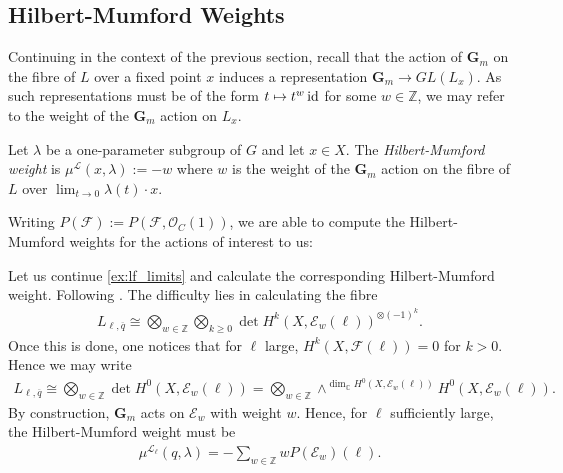 \documentclass[12pt]{ociamthesis}  %
\begin{document}
\subsection{Hilbert-Mumford Weights}


Continuing in the context of the previous section, recall that the action
of $\mathbf G_m$ on the fibre of $L$ over a fixed point $x$ induces a
representation $\mathbf G_m\to GL(L_x)$. As such representations must
be of the form $t \mapsto t^w\operatorname{id}$ for some $w\in\mathbb Z$,
we may refer to the weight of the $\mathbf G_m$ action on $L_x$.

\begin{definition}
  Let $\lambda$ be a one-parameter subgroup of $G$ and let
  $x\in X$. The \emph{Hilbert-Mumford weight}
  is $\mu^{\mathscr L}(x,\lambda) := -w$ where $w$ is the weight of the
  $\mathbf G_m$ action on the fibre of $L$ over $\lim_{t\to 0}\lambda(t)\cdot x$.
\end{definition}

Writing $P(\mathscr F) := P(\mathscr F,\mathscr O_C(1))$, we are
able to compute the Hilbert-Mumford weights for the actions of
interest to us:

\begin{example}\label{ex:lf_hm_weight}
  Let us continue \ref{ex:lf_limits} and calculate the corresponding
  Hilbert-Mumford weight. Following \cite[Lemma 8.52]{hoskins2016}.
  The difficulty lies
  in calculating the fibre
  \begin{align*}
    L_{\ell,\overline q} \cong \bigotimes_{w\in\mathbb Z}\bigotimes_{k\geq 0} \det H^k(X,\mathscr E_w(\ell))^{\otimes(-1)^k}.
  \end{align*}
  Once this is done, one notices that for $\ell$ large,
  $H^k(X,\mathscr F(\ell))=0$ for $k>0$. Hence we may write
  \begin{align*}
    L_{\ell,\overline q}
    \cong \bigotimes_{w\in\mathbb Z}\det H^0(X,\mathscr E_w(\ell))
    = \bigotimes_{w\in\mathbb Z}\wedge^{\dim_{\mathbb C}H^0(X,\mathscr E_w(\ell))} H^0(X,\mathscr E_w(\ell)).
  \end{align*}
  By construction, $\mathbf G_m$ acts on $\mathscr E_w$ with weight
  $w$. Hence, for $\ell$ sufficiently large, the Hilbert-Mumford
  weight must be
  \begin{align*}
    \mu^{\mathscr L_\ell}(q,\lambda) =
    -\sum_{w\in\mathbb Z} w P(\mathscr E_w)(\ell).
  \end{align*}
\end{example}
\end{document}
